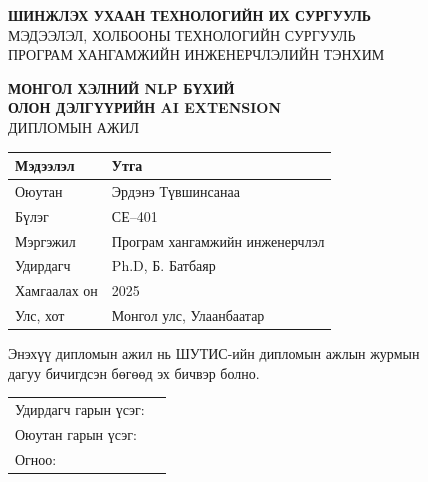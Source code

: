 \documentclass[12pt,a4paper]{report}
\begin{document}
\thispagestyle{empty}
\begin{center}
  \vspace*{0.5cm}
  {\large\bfseries
    ШИНЖЛЭХ УХААН ТЕХНОЛОГИЙН ИХ СУРГУУЛЬ}\\[6pt]
  {\normalsize
    МЭДЭЭЛЭЛ, ХОЛБООНЫ ТЕХНОЛОГИЙН СУРГУУЛЬ}\\[4pt]
  {\normalsize
    ПРОГРАМ ХАНГАМЖИЙН ИНЖЕНЕРЧЛЭЛИЙН ТЭНХИМ}

  \vspace{1.5cm}
  {\Large\bfseries
    МОНГОЛ ХЭЛНИЙ NLP БҮХИЙ\\[6pt]
    ОЛОН ДЭЛГҮҮРИЙН AI EXTENSION}\\[12pt]
  {\normalsize ДИПЛОМЫН АЖИЛ}

  \vspace{1.2cm}
  \begin{tabular}{@{}ll@{}}
    \toprule
    \textbf{Мэдээлэл} & \textbf{Утга} \\
    \midrule
    Оюутан      & Эрдэнэ Түвшинсанаа \\
    Бүлэг       & СЕ--401 \\
    Мэргэжил    & Програм хангамжийн инженерчлэл \\
    Удирдагч    & Ph.D, Б. Батбаяр \\
    Хамгаалах он & 2025 \\
    Улс, хот    & Монгол улс, Улаанбаатар \\
    \bottomrule
  \end{tabular}

  \vspace{1.8cm}
  {\small
    Энэхүү дипломын ажил нь ШУТИС-ийн дипломын ажлын журмын\\
    дагуу бичигдсэн бөгөөд эх бичвэр болно.}

  \vspace{0.8cm}
  \begin{tabular}{@{}ll@{}}
    Удирдагч гарын үсэг: & \underline{\hspace{5cm}} \\[8pt]
    Оюутан гарын үсэг:   & \underline{\hspace{5cm}} \\[8pt]
    Огноо:               & \underline{\hspace{5cm}} \\
  \end{tabular}
\end{center}
\clearpage
\end{document}
